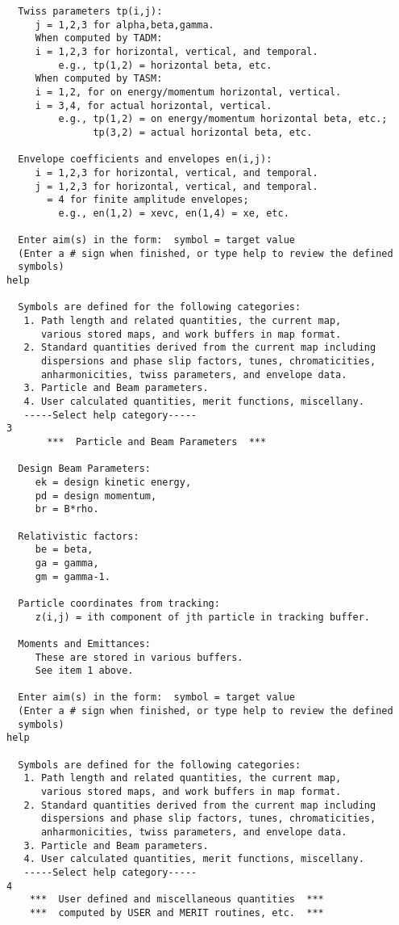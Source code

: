 \begin{footnotesize}
\begin{verbatim}
  Twiss parameters tp(i,j):
     j = 1,2,3 for alpha,beta,gamma.
     When computed by TADM:
     i = 1,2,3 for horizontal, vertical, and temporal.
         e.g., tp(1,2) = horizontal beta, etc.
     When computed by TASM:
     i = 1,2, for on energy/momentum horizontal, vertical.
     i = 3,4, for actual horizontal, vertical.
         e.g., tp(1,2) = on energy/momentum horizontal beta, etc.;
               tp(3,2) = actual horizontal beta, etc.

  Envelope coefficients and envelopes en(i,j):
     i = 1,2,3 for horizontal, vertical, and temporal.
     j = 1,2,3 for horizontal, vertical, and temporal.
       = 4 for finite amplitude envelopes;
         e.g., en(1,2) = xevc, en(1,4) = xe, etc.

  Enter aim(s) in the form:  symbol = target value
  (Enter a # sign when finished, or type help to review the defined
  symbols)
help

  Symbols are defined for the following categories:
   1. Path length and related quantities, the current map,
      various stored maps, and work buffers in map format.
   2. Standard quantities derived from the current map including
      dispersions and phase slip factors, tunes, chromaticities,
      anharmonicities, twiss parameters, and envelope data.
   3. Particle and Beam parameters.
   4. User calculated quantities, merit functions, miscellany.
   -----Select help category-----
3
       ***  Particle and Beam Parameters  ***

  Design Beam Parameters:
     ek = design kinetic energy,
     pd = design momentum,
     br = B*rho.

  Relativistic factors:
     be = beta,
     ga = gamma,
     gm = gamma-1.

  Particle coordinates from tracking:
     z(i,j) = ith component of jth particle in tracking buffer.

  Moments and Emittances:
     These are stored in various buffers.
     See item 1 above.

  Enter aim(s) in the form:  symbol = target value
  (Enter a # sign when finished, or type help to review the defined
  symbols)
help

  Symbols are defined for the following categories:
   1. Path length and related quantities, the current map,
      various stored maps, and work buffers in map format.
   2. Standard quantities derived from the current map including
      dispersions and phase slip factors, tunes, chromaticities,
      anharmonicities, twiss parameters, and envelope data.
   3. Particle and Beam parameters.
   4. User calculated quantities, merit functions, miscellany.
   -----Select help category-----
4
    ***  User defined and miscellaneous quantities  ***
    ***  computed by USER and MERIT routines, etc.  ***


\end{verbatim}
\end{footnotesize}
